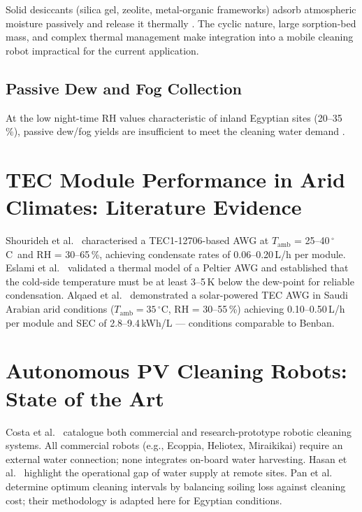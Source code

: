 \documentclass[12pt,a4paper]{report}
\numberwithin{equation}{chapter}
\numberwithin{figure}{chapter}
\numberwithin{table}{chapter}
\newcommand{\degC}{$^\circ$C}
\begin{document}
Solid desiccants (silica gel, zeolite, metal-organic frameworks) adsorb atmospheric
moisture passively and release it thermally \cite{zhou2020review,feng2022review}. The
cyclic nature, large sorption-bed mass, and complex thermal management make integration
into a mobile cleaning robot impractical for the current application.

\subsection{Passive Dew and Fog Collection}

At the low night-time RH values characteristic of inland Egyptian sites (20--35\,\%),
passive dew/fog yields are insufficient to meet the cleaning water demand
\cite{feng2022review}.

\section{TEC Module Performance in Arid Climates: Literature Evidence}

Shourideh et al.\ \cite{shourideh2021tec} characterised a TEC1-12706-based AWG at
$T_\mathrm{amb}$ = 25--40\,\degC\ and RH = 30--65\,\%, achieving condensate rates of
0.06--0.20\,L/h per module. Eslami et al.\ \cite{eslami2021tec} validated a thermal
model of a Peltier AWG and established that the cold-side temperature must be at least
3--5\,K below the dew-point for reliable condensation. Alqaed et al.\
\cite{alqaed2023awg} demonstrated a solar-powered TEC AWG in Saudi Arabian arid
conditions ($T_\mathrm{amb} = 35$\,\degC, RH = 30--55\,\%) achieving 0.10--0.50\,L/h
per module and SEC of 2.8--9.4\,kWh/L --- conditions comparable to Benban.

\section{Autonomous PV Cleaning Robots: State of the Art}

Costa et al.\ \cite{costa2021pvrobot} catalogue both commercial and research-prototype
robotic cleaning systems. All commercial robots (e.g., Ecoppia, Heliotex, Miraikikai)
require an external water connection; none integrates on-board water harvesting. Hasan
et al.\ \cite{hasan2023cleaningrobot} highlight the operational gap of water supply at
remote sites. Pan et al.\ \cite{pan2022robotdesign} determine optimum cleaning intervals
by balancing soiling loss against cleaning cost; their methodology is adapted here for
Egyptian conditions.
\end{document}
